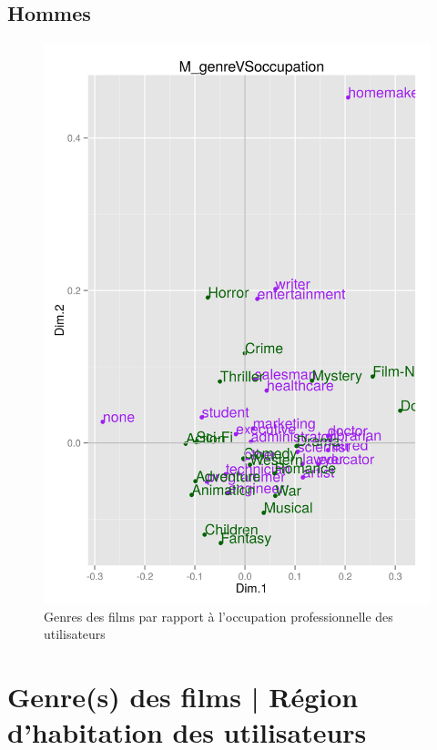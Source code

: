 \documentclass[11pt]{article}
\begin{document}
\subsection{Hommes}
\begin{figure}[htd]
\centering
\includegraphics[scale=0.65]{./images/M_genreVSoccupation}
\caption{Genres des films par rapport à l'occupation professionnelle des utilisateurs}
\end{figure}


\pagebreak
\section{Genre(s) des films | Région d'habitation des utilisateurs}
\end{document}
